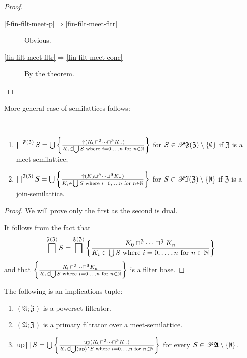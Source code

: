 \begin{proof}
~
\begin{description}
\item [{\ref{f-fin-filt-meet-p}$\Rightarrow$\ref{fin-filt-meet-fltr}}] Obvious.
\item [{\ref{fin-filt-meet-fltr}$\Rightarrow$\ref{fin-filt-meet-conc}}] By
the theorem.
\end{description}
\end{proof}
More general case of semilattices follows:
\begin{thm}
~
\begin{enumerate}
\item $\bigsqcap^{\mathfrak{F}(\mathfrak{Z})}S=\bigcup\left\{ \frac{\uparrow(K_{0}\sqcap^{\mathfrak{Z}}\dots\sqcap^{\mathfrak{Z}}K_{n})}{K_{i}\in\bigcup S\text{ where }i=0,\dots,n\text{ for }n\in\mathbb{N}}\right\}$
for $S\in\mathscr{P}\mathfrak{F}(\mathfrak{Z})\setminus\{\emptyset\}$
if $\mathfrak{Z}$ is a meet-semilattice;
\item $\bigsqcup^{\mathfrak{I}(\mathfrak{Z})}S=\bigcup\left\{ \frac{\uparrow(K_{0}\sqcup^{\mathfrak{Z}}\dots\sqcup^{\mathfrak{Z}}K_{n})}{K_{i}\in\bigcup S\text{ where }i=0,\dots,n\text{ for }n\in\mathbb{N}}\right\}$
for $S\in\mathscr{P}\mathfrak{I}(\mathfrak{Z})\setminus\{\emptyset\}$
if $\mathfrak{Z}$ is a join-semilattice.
\end{enumerate}
\end{thm}
\begin{proof}
We will prove only the first as the second is dual.

It follows from the fact that 
\[
\bigsqcap^{\mathfrak{F}(\mathfrak{Z})}S=\bigsqcap^{\mathfrak{F}(\mathfrak{Z})}\left\{ \frac{K_{0}\sqcap^{\mathfrak{Z}}\dots\sqcap^{\mathfrak{Z}}K_{n}}{K_{i}\in\bigcup S\text{ where }i=0,\dots,n\text{ for }n\in\mathbb{N}}\right\}
\]
and that $\left\{ \frac{K_{0}\sqcap^{\mathfrak{Z}}\dots\sqcap^{\mathfrak{Z}}K_{n}}{K_{i}\in\bigcup S\text{ where }i=0,\dots,n\text{ for }n\in\mathbb{N}}\right\}$
is a filter base.\end{proof}
\begin{cor}
\label{meet-filtx}The following is an implications tuple:
\begin{enumerate}
\item $(\mathfrak{A};\mathfrak{Z})$ is a powerset filtrator.
\item $(\mathfrak{A};\mathfrak{Z})$ is a primary filtrator over a meet-semilattice.
\item $\operatorname{up}\bigsqcap S=\bigcup\left\{ \frac{\operatorname{up}(K_{0}\sqcap^{\mathfrak{Z}}\dots\sqcap^{\mathfrak{Z}}K_{n})}{K_{i}\in\bigcup\left\langle \operatorname{up}\right\rangle ^{\ast}S\text{ where }i=0,\dots,n\text{ for }n\in\mathbb{N}}\right\}$
for every $S\in\mathscr{P}\mathfrak{A}\setminus\{\emptyset\}$.
\end{enumerate}
\end{cor}
